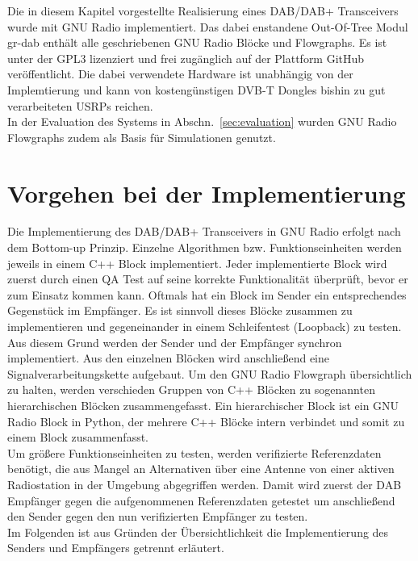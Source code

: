 Die in diesem Kapitel vorgestellte Realisierung eines DAB/DAB+ Transceivers wurde mit GNU Radio implementiert. Das dabei enstandene Out-Of-Tree Modul gr-dab enthält alle geschriebenen GNU Radio Blöcke und Flowgraphs. Es ist unter der \ac{GPL3} lizenziert und frei zugänglich auf der Plattform GitHub~\cite{repo:gr-dab} veröffentlicht. Die dabei verwendete Hardware ist unabhängig von der Implemtierung und kann von kostengünstigen DVB-T Dongles bishin zu gut verarbeiteten \acp{USRP} reichen.\\
In der Evaluation des Systems in Abschn.~\ref{sec:evaluation} wurden GNU Radio Flowgraphs zudem als Basis für Simulationen genutzt.

\section{Vorgehen bei der Implementierung}
Die Implementierung des DAB/DAB+ Transceivers in GNU Radio erfolgt nach dem Bottom-up Prinzip. Einzelne Algorithmen bzw. Funktionseinheiten werden jeweils in einem C++ Block implementiert. Jeder implementierte Block wird zuerst durch einen \ac{QA} Test auf seine korrekte Funktionalität überprüft, bevor er zum Einsatz kommen kann. Oftmals hat ein Block im Sender ein entsprechendes Gegenstück im Empfänger. Es ist sinnvoll dieses Blöcke zusammen zu implementieren und gegeneinander in einem Schleifentest (Loopback) zu testen. Aus diesem Grund werden der Sender und der Empfänger synchron implementiert. Aus den einzelnen Blöcken wird anschließend eine Signalverarbeitungskette aufgebaut. Um den GNU Radio Flowgraph übersichtlich zu halten, werden verschieden Gruppen von C++ Blöcken zu sogenannten hierarchischen Blöcken zusammengefasst. Ein hierarchischer Block ist ein GNU Radio Block in Python, der mehrere C++ Blöcke intern verbindet und somit zu einem Block zusammenfasst.\\
Um größere Funktionseinheiten zu testen, werden verifizierte Referenzdaten benötigt, die aus Mangel an Alternativen über eine Antenne von einer aktiven Radiostation in der Umgebung abgegriffen werden. Damit wird zuerst der DAB Empfänger gegen die aufgenommenen Referenzdaten getestet um anschließend den Sender gegen den nun verifizierten Empfänger zu testen.\\
Im Folgenden ist aus Gründen der Übersichtlichkeit die Implementierung des Senders und Empfängers getrennt erläutert.